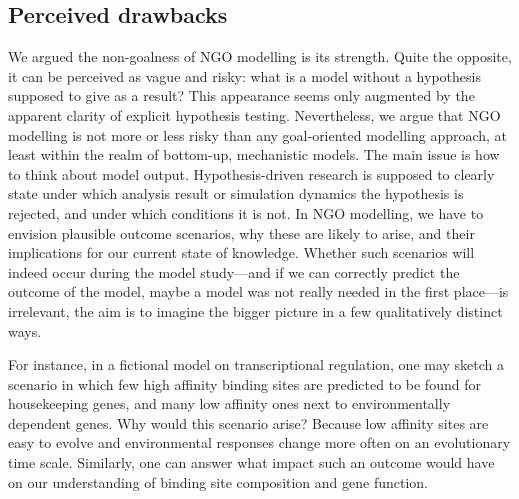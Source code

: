 \subsection{Perceived drawbacks}

We argued the non-goalness of NGO modelling is its strength. Quite the opposite, it can be perceived as vague and risky: what is a model without a hypothesis supposed to give as a result? This appearance seems only augmented by the apparent clarity of explicit hypothesis testing. Nevertheless, we argue that NGO modelling is not more or less risky than any goal-oriented modelling approach, at least within the realm of bottom-up, mechanistic models. The main issue is how to think about model output. Hypothesis-driven research is supposed to clearly state under which analysis result or simulation dynamics the hypothesis is rejected, and under which conditions it is not. In NGO modelling, we have to envision plausible outcome scenarios, why these are likely to arise, and their implications for our current state of knowledge. Whether such scenarios will indeed occur during the model study---and if we can correctly predict the outcome of the model, maybe a model was not really needed in the first place---is irrelevant, the aim is to imagine the bigger picture in a few qualitatively distinct ways.

For instance, in a fictional model on transcriptional regulation, one may sketch a scenario in which few high affinity binding sites are predicted to be found for housekeeping genes, and many low affinity ones next to environmentally dependent genes. Why would this scenario arise? Because low affinity sites are easy to evolve and environmental responses change more often on an evolutionary time scale. Similarly, one can answer what impact such an outcome would have on our understanding of binding site composition and gene function.